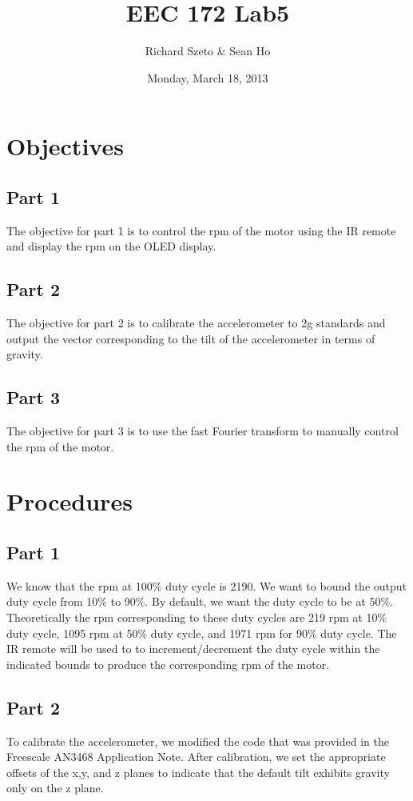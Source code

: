\documentclass[11pt, titlepage]{article}
\title{EEC 172 Lab5}
\author{Richard Szeto \& Sean Ho}
\date{Monday, March 18, 2013}
\begin{document}
    \maketitle
    
    \section{Objectives}
        \subsection{Part 1}
            The objective for part 1 is to control the rpm of the motor using the IR remote and display the rpm on the OLED display.
        \subsection{Part 2}
            The objective for part 2 is to calibrate the accelerometer to 2g standards and output the vector corresponding to the tilt of the accelerometer in terms of gravity.
        \subsection{Part 3}
            The objective for part 3 is to use the fast Fourier transform to manually control the rpm of the motor.
    \section{Procedures}
        \subsection{Part 1}
            We know that the rpm at 100\% duty cycle is 2190. We want to bound the output duty cycle from 10\% to 90\%. By default, we want the duty cycle to be at 50\%. Theoretically the rpm corresponding to these duty cycles are 219 rpm at 10\% duty cycle, 1095 rpm at 50\% duty cycle, and 1971 rpm for 90\% duty cycle. The IR remote will be used to to increment/decrement the duty cycle within the indicated bounds to produce the corresponding rpm of the motor.
        \subsection{Part 2}
            To calibrate the accelerometer, we modified the code that was provided in the Freescale AN3468 Application Note. After calibration, we set the appropriate offsets of the x,y, and z planes to indicate that the default tilt exhibits gravity only on the z plane.
\end{document}
